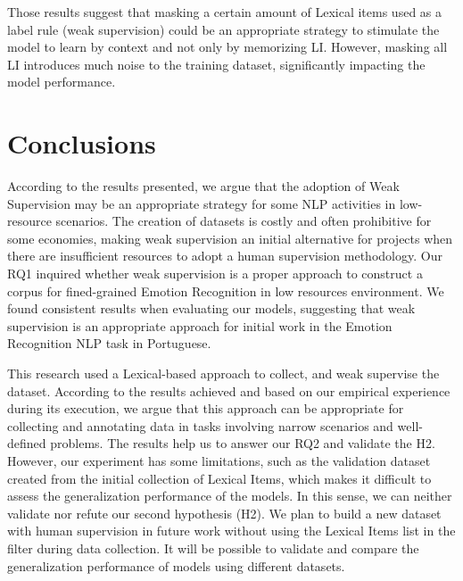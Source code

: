 \documentclass[12pt]{article}
\begin{document}
Those results suggest that masking a certain amount of Lexical items used as a label rule (weak supervision) could be an appropriate strategy to stimulate the model to learn by context and not only by memorizing LI. However, masking all LI introduces much noise to the training dataset, significantly impacting the model performance.


\section{Conclusions}

According to the results presented, we argue that the adoption of Weak Supervision may be an appropriate strategy for some NLP activities in low-resource scenarios. The creation of datasets is costly and often prohibitive for some economies, making weak supervision an initial alternative for projects when there are insufficient resources to adopt a human supervision methodology. Our RQ1 inquired whether weak supervision is a proper approach to construct a corpus for fined-grained Emotion Recognition in low resources environment. We found consistent results when evaluating our models, suggesting that weak supervision is an appropriate approach for initial work in the Emotion Recognition NLP task in Portuguese.

This research used a Lexical-based approach to collect, and weak supervise the dataset. According to the results achieved and based on our empirical experience during its execution, we argue that this approach can be appropriate for collecting and annotating data in tasks involving narrow scenarios and well-defined problems. The results help us to answer our RQ2 and validate the H2. However, our experiment has some limitations, such as the validation dataset created from the initial collection of Lexical Items, which makes it difficult to assess the generalization performance of the models. In this sense, we can neither validate nor refute our second hypothesis (H2). We plan to build a new dataset with human supervision in future work without using the Lexical Items list in the filter during data collection. It will be possible to validate and compare the generalization performance of models using different datasets.




\end{document}
